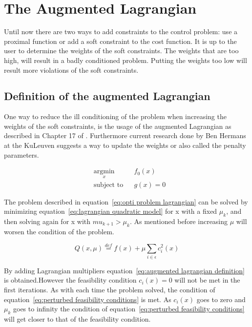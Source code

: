 \chapter{The Augmented Lagrangian}
Until now there are two ways to add constraints to the control problem: use a proximal function or add a soft constraint to the cost function. It is up to the user to determine the weights of the soft constraints. The weights that are too high, will result in a badly conditioned problem. Putting the weights too low will result more violations of the soft constraints.

\section{Definition of the augmented Lagrangian}
	One way to reduce the ill conditioning of the problem when increasing the weights of the soft constraints, is the usage of the augmented Lagrangian as described in Chapter 17 of \cite{Wright}. Furthermore current research done by Ben Hermans at the KuLeuven suggests a way to update the weights or also called the penalty parameters.
	
	\begin{equation}
		\begin{aligned}
			& \underset{x}{\text{argmin}}
			& & f_0(x) \\
			& \text{subject to}
			& & g(x)=0
		\end{aligned}
		\label{eq:opti problem lagrangian}
	\end{equation}
	
	The problem described in equation~\ref{eq:opti problem lagrangian} can be solved by minimizing equation~\ref{eq:lagrangian quadratic model}  for x with a fixed $\mu_k$, and then solving again for x with $mu_{k+1}>\mu_k $. As mentioned before increasing $\mu$ will worsen the condition of the problem. 
	
	\begin{equation}
		Q(x,\mu) \overset{def}{=} f(x) + \mu \sum_{i \in \epsilon} c_i^2(x)
		\label{eq:lagrangian quadratic model}
	\end{equation}
	
	By adding Lagrangian multipliers equation~\ref{eq:augmented lagrangian definition} is obtained.However the feasibility condition $c_i(x)=0$ will not be met in the first iterations. As with each time the problem solved, the condition of equation~\ref{eq:perturbed feasibility conditions} is met. As $c_i(x)$ goes to zero and $\mu_k$ goes to infinity the condition of equation~\ref{eq:perturbed feasibility conditions} will get closer to that of the feasibility condition.
	

